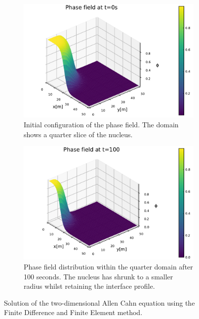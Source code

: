 \documentclass[asi,article,submit,moreauthors]{Definitions/mdpi}
\begin{document}
\begin{figure}
    \centering
    \begin{subfigure}[t]{0.49\textwidth}
        \centering
        \includegraphics[width=\textwidth]{Figs/Examples/Allen-Cahn/IC.pdf}
        \caption{Initial configuration of the phase field. The domain shows a quarter slice of the nucleus.}
        \label{fig:nucleus-ic}
    \end{subfigure}
    \hfill
    \begin{subfigure}[t]{0.49\textwidth}
        \centering
        \includegraphics[width=\textwidth]{Figs/Examples/Allen-Cahn/final.pdf}
        \caption{Phase field distribution within the quarter domain after 100 seconds. The nucleus has shrunk to a smaller radius whilst retaining the interface profile.}
        \label{fig:nucleus-final}
    \end{subfigure}
   \caption{Solution of the two-dimensional Allen Cahn equation using the Finite Difference and Finite Element method.}
   \label{fig:ac-nucleus}
\end{figure}
\end{document}
